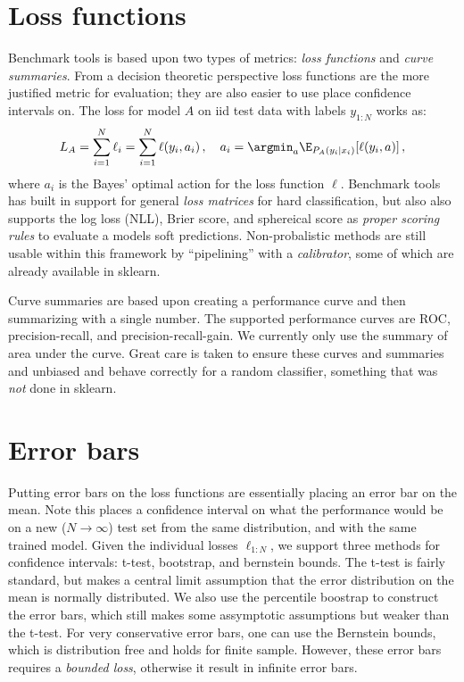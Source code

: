 \documentclass{article}
\begin{document}
\section{Loss functions}

Benchmark tools is based upon two types of metrics: \emph{loss functions} and \emph{curve summaries}.
From a decision theoretic perspective loss functions are the more justified metric for evaluation; they are also easier to use place confidence intervals on.
The loss for model $A$ on iid test data with labels $y_{1:N}$ works as:
\begin{align}
  L_A = \sum_{i=1}^N \ell_i = \sum_{i=1}^N \ell(y_i, a_i)\,, \quad a_i = \argmin_a \E_{P_A(y_i|x_i)}[\ell(y_i, a)]\,,
\end{align}
where $a_i$ is the Bayes' optimal action for the loss function $\ell$.
Benchmark tools has built in support for general \emph{loss matrices} for hard classification, but also also supports the log loss (NLL), Brier score, and sphereical score as \emph{proper scoring rules} to evaluate a models soft predictions.
Non-probalistic methods are still usable within this framework by ``pipelining'' with a \emph{calibrator}, some of which are already available in sklearn.

Curve summaries are based upon creating a performance curve and then summarizing with a single number.
The supported performance curves are ROC, precision-recall, and precision-recall-gain.
We currently only use the summary of area under the curve.
Great care is taken to ensure these curves and summaries and unbiased and behave correctly for a random classifier, something that was \emph{not} done in sklearn.  %

\section{Error bars}

Putting error bars on the loss functions are essentially placing an error bar on the mean.
Note this places a confidence interval on what the performance would be on a new ($N \rightarrow \infty$) test set from the same distribution, and with the same trained model.
Given the individual losses $\ell_{1:N}$, we support three methods for confidence intervals: t-test, bootstrap, and bernstein bounds.
The t-test is fairly standard, but makes a central limit assumption that the error distribution on the mean is normally distributed.
We also use the percentile boostrap to construct the error bars, which still makes some assymptotic assumptions but weaker than the t-test.
For very conservative error bars, one can use the Bernstein bounds, which is distribution free and holds for finite sample.  %
However, these error bars requires a \emph{bounded loss}, otherwise it result in infinite error bars.
\end{document}
